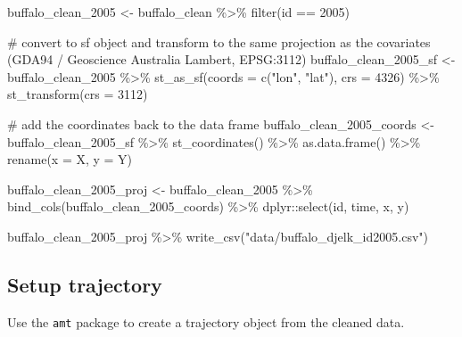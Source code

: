 \documentclass[
  letterpaper,
  DIV=11,
  numbers=noendperiod]{scrartcl}
\newenvironment{Shaded}{\begin{snugshade}}{\end{snugshade}}
\newcommand{\AttributeTok}[1]{\textcolor[rgb]{0.40,0.45,0.13}{#1}}
\newcommand{\CommentTok}[1]{\textcolor[rgb]{0.37,0.37,0.37}{#1}}
\newcommand{\DecValTok}[1]{\textcolor[rgb]{0.68,0.00,0.00}{#1}}
\newcommand{\FunctionTok}[1]{\textcolor[rgb]{0.28,0.35,0.67}{#1}}
\newcommand{\NormalTok}[1]{\textcolor[rgb]{0.00,0.23,0.31}{#1}}
\newcommand{\OtherTok}[1]{\textcolor[rgb]{0.00,0.23,0.31}{#1}}
\newcommand{\SpecialCharTok}[1]{\textcolor[rgb]{0.37,0.37,0.37}{#1}}
\newcommand{\StringTok}[1]{\textcolor[rgb]{0.13,0.47,0.30}{#1}}
\begin{document}
\begin{Shaded}
\begin{Highlighting}[]
\NormalTok{buffalo\_clean\_2005 }\OtherTok{\textless{}{-}}\NormalTok{ buffalo\_clean }\SpecialCharTok{\%\textgreater{}\%} \FunctionTok{filter}\NormalTok{(id }\SpecialCharTok{==} \DecValTok{2005}\NormalTok{) }

\CommentTok{\# convert to sf object and transform to the same projection as the covariates (GDA94 / Geoscience Australia Lambert, EPSG:3112)}
\NormalTok{buffalo\_clean\_2005\_sf }\OtherTok{\textless{}{-}}\NormalTok{ buffalo\_clean\_2005 }\SpecialCharTok{\%\textgreater{}\%} 
  \FunctionTok{st\_as\_sf}\NormalTok{(}\AttributeTok{coords =} \FunctionTok{c}\NormalTok{(}\StringTok{"lon"}\NormalTok{, }\StringTok{"lat"}\NormalTok{), }\AttributeTok{crs =} \DecValTok{4326}\NormalTok{) }\SpecialCharTok{\%\textgreater{}\%} 
  \FunctionTok{st\_transform}\NormalTok{(}\AttributeTok{crs =} \DecValTok{3112}\NormalTok{) }

\CommentTok{\# add the coordinates back to the data frame}
\NormalTok{buffalo\_clean\_2005\_coords }\OtherTok{\textless{}{-}}\NormalTok{ buffalo\_clean\_2005\_sf }\SpecialCharTok{\%\textgreater{}\%} 
  \FunctionTok{st\_coordinates}\NormalTok{() }\SpecialCharTok{\%\textgreater{}\%} 
  \FunctionTok{as.data.frame}\NormalTok{() }\SpecialCharTok{\%\textgreater{}\%} 
  \FunctionTok{rename}\NormalTok{(}\AttributeTok{x =}\NormalTok{ X, }\AttributeTok{y =}\NormalTok{ Y)}

\NormalTok{buffalo\_clean\_2005\_proj }\OtherTok{\textless{}{-}}\NormalTok{ buffalo\_clean\_2005 }\SpecialCharTok{\%\textgreater{}\%} 
  \FunctionTok{bind\_cols}\NormalTok{(buffalo\_clean\_2005\_coords) }\SpecialCharTok{\%\textgreater{}\%} 
\NormalTok{  dplyr}\SpecialCharTok{::}\FunctionTok{select}\NormalTok{(id, time, x, y)}

\NormalTok{buffalo\_clean\_2005\_proj }\SpecialCharTok{\%\textgreater{}\%} \FunctionTok{write\_csv}\NormalTok{(}\StringTok{"data/buffalo\_djelk\_id2005.csv"}\NormalTok{)}
\end{Highlighting}
\end{Shaded}

\subsection{Setup trajectory}\label{setup-trajectory}

Use the \texttt{amt} package to create a trajectory object from the
cleaned data.
\end{document}
